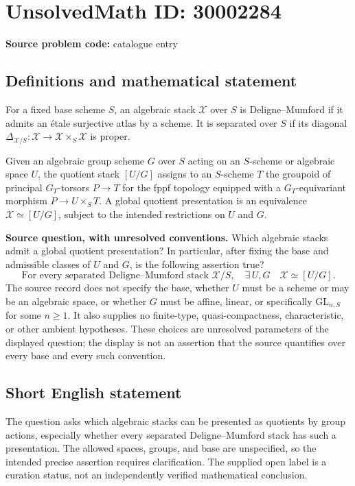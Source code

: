 \documentclass[11pt]{article}
\begin{document}
\section*{UnsolvedMath ID: 30002284}
\textbf{Source problem code:} catalogue entry
\subsection{Definitions and mathematical statement}
For a fixed base scheme \(S\), an algebraic stack \(\mathcal X\) over \(S\) is Deligne--Mumford if it admits an étale surjective atlas by a scheme. It is separated over \(S\) if its diagonal \(\Delta_{\mathcal X/S}\colon\mathcal X\to\mathcal X\times_S\mathcal X\) is proper.

Given an algebraic group scheme \(G\) over \(S\) acting on an \(S\)-scheme or algebraic space \(U\), the quotient stack \([U/G]\) assigns to an \(S\)-scheme \(T\) the groupoid of principal \(G_T\)-torsors \(P\to T\) for the fppf topology equipped with a \(G_T\)-equivariant morphism \(P\to U\times_S T\). A global quotient presentation is an equivalence \(\mathcal X\simeq[U/G]\), subject to the intended restrictions on \(U\) and \(G\).

\textbf{Source question, with unresolved conventions.} Which algebraic stacks admit a global quotient presentation? In particular, after fixing the base and admissible classes of \(U\) and \(G\), is the following assertion true?
\[
\text{For every separated Deligne--Mumford stack }\mathcal X/S,
\quad \exists\,U,G\quad \mathcal X\simeq[U/G].
\]
The source record does not specify the base, whether \(U\) must be a scheme or may be an algebraic space, or whether \(G\) must be affine, linear, or specifically \(\mathrm{GL}_{n,S}\) for some \(n\geq1\). It also supplies no finite-type, quasi-compactness, characteristic, or other ambient hypotheses. These choices are unresolved parameters of the displayed question; the display is not an assertion that the source quantifies over every base and every such convention.
\subsection{Short English statement}
The question asks which algebraic stacks can be presented as quotients by group actions, especially whether every separated Deligne--Mumford stack has such a presentation. The allowed spaces, groups, and base are unspecified, so the intended precise assertion requires clarification. The supplied open label is a curation status, not an independently verified mathematical conclusion.
\end{document}
